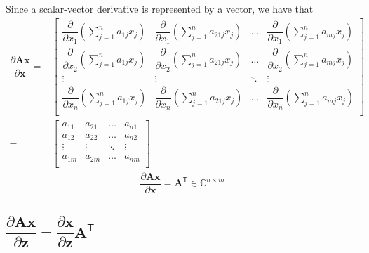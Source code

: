 \documentclass{article}
\newcommand{\trans}{\mathsf{T}}
\begin{document}
Since a scalar-vector derivative is represented by a vector, we have that
\begin{align}
    \dfrac{\partial \mathbf{A} \mathbf{x}}{\partial \mathbf{x}} = & \begin{bmatrix}
        \dfrac{\partial}{\partial x_1} \left( \sum_{j = 1}^n a_{1j}x_j \right) & 
        \dfrac{\partial}{\partial x_1} \left( \sum_{j = 1}^n a_{21j}x_j \right) & 
        \dots & 
        \dfrac{\partial}{\partial x_1} \left( \sum_{j = 1}^n a_{mj}x_j \right) \\
        \dfrac{\partial}{\partial x_2} \left( \sum_{j = 1}^n a_{1j}x_j \right) & 
        \dfrac{\partial}{\partial x_2} \left( \sum_{j = 1}^n a_{21j}x_j \right) & 
        \dots & 
        \dfrac{\partial}{\partial x_2} \left( \sum_{j = 1}^n a_{mj}x_j \right) \\
        \vdots & \vdots & \ddots & \vdots \\
        \dfrac{\partial}{\partial x_n} \left( \sum_{j = 1}^n a_{1j}x_j \right) & 
        \dfrac{\partial}{\partial x_n} \left( \sum_{j = 1}^n a_{21j}x_j \right) & 
        \dots & 
        \dfrac{\partial}{\partial x_n} \left( \sum_{j = 1}^n a_{mj}x_j \right) \\
    \end{bmatrix}  \\
    = & \begin{bmatrix}
        a_{11} & a_{21} & \dots & a_{n1} \\
        a_{12} & a_{22} & \dots & a_{n2} \\
        \vdots & \vdots & \ddots & \vdots \\
        a_{1m} & a_{2m} & \dots & a_{nm} \\
    \end{bmatrix}
\end{align}
\begin{align}
    \label{eq:lt-slution}
    \boxed{\dfrac{\partial \mathbf{A} \mathbf{x}}{\partial \mathbf{x}} = \mathbf{A}^\trans \in \mathbb{C}^{n\times m}}
\end{align}

\subsection{\(\dfrac{\partial \mathbf{A}  \mathbf{x}}{\partial \mathbf{z}} = \dfrac{\partial \mathbf{x}}{\partial \mathbf{z}} \mathbf{A}^\trans\)}
\end{document}

